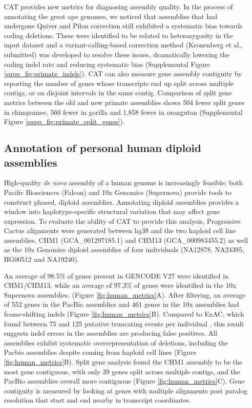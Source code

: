 \documentclass[fleqn,10pt]{wlscirep}
\begin{document}
CAT provides new metrics for diagnosing assembly quality. In the process of annotating the great ape genomes, we noticed that assemblies that had undergone Quiver and Pilon  \citep{walker2014pilon} correction still exhibited a systematic bias towards coding deletions. These were identified to be related to heterozygosity in the input dataset and a variant-calling-based correction method (Kronenberg et al., submitted) was developed to resolve these issues, dramatically lowering the coding indel rate and reducing systematic bias (Supplemental Figure \ref{supp_fig:primate_indels}). CAT can also measure gene assembly contiguity by reporting the number of genes whose transcripts end up split across multiple contigs, or on disjoint intervals in the same contig. Comparison of split gene metrics between the old and new primate assemblies shows 504 fewer split genes in chimpanzee, 560 fewer in gorilla and 1,858 fewer in orangutan (Supplemental Figure \ref{supp_fig:primate_split_genes}).


\subsection*{Annotation of personal human diploid assemblies}

High-quality \textit{de novo} assembly of a human genome is increasingly feasible; both Pacific Biosciences  \citep{chin2016phased,huddleston2016discovery,korlach2017novo} (Falcon) and 10x Genomics  \citep{weisenfeld2017direct} (Supernova) provide tools to construct phased, diploid assemblies. Annotating diploid assemblies provides a window into haplotype-specific structural variation that may affect gene expression. To evaluate the ability of CAT to provide this analysis, Progressive Cactus alignments were generated between hg38 and the two haploid cell line assemblies, CHM1 (GCA\_001297185.1) and CHM13 (GCA\_000983455.2) as well as the 10x Genomics diploid assemblies of four individuals (NA12878, NA24385, HG00512 and NA19240).

An average of 98.5\% of genes present in GENCODE V27 were identified in CHM1/CHM13, while an average of 97.3\% of genes were identified in the 10x Supernova assemblies. (Figure \ref{fig:human_metrics}A). After filtering, an average of 552 genes in the PacBio assemblies and 461 genes in the 10x assemblies had frame-shifting indels (Figure \ref{fig:human_metrics}B). Compared to ExAC, which found between 75 and 125 putative truncating events per individual  \citep{karczewski2016exac}, this result suggests indel errors in the assemblies are producing false positives. All assemblies exhibit systematic overrepresentation of deletions, including the Pacbio assemblies despite coming from haploid cell lines (Figure \ref{fig:human_metrics}B). Split gene analysis found the CHM1 assembly to be the most gene contiguous, with only 39 genes split across multiple contigs, and the PacBio assemblies overall more contiguous (Figure \ref{fig:human_metrics}C). Gene contiguity is measured by looking at genes with multiple alignments post paralog resolution that start and end nearby in transcript coordinates.
\end{document}
